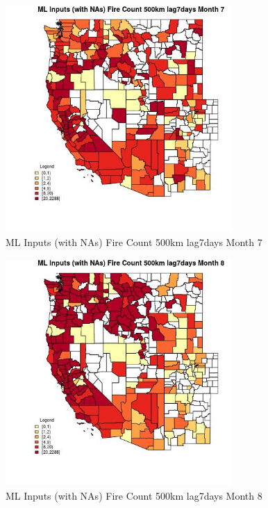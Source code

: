 \begin{figure} 
\centering  
\includegraphics[width=0.77\textwidth]{Code_Outputs/Report_ML_input_PM25_Step4_part_e_de_duplicated_aves_compiled_2019-05-20wNAs_CountyFire_Count_500km_lag7daysmedianMonth7.jpg} 
\caption{\label{fig:Report_ML_input_PM25_Step4_part_e_de_duplicated_aves_compiled_2019-05-20wNAsCountyFire_Count_500km_lag7daysmedianMonth7}ML Inputs (with NAs) Fire Count 500km lag7days Month 7} 
\end{figure} 
 

\begin{figure} 
\centering  
\includegraphics[width=0.77\textwidth]{Code_Outputs/Report_ML_input_PM25_Step4_part_e_de_duplicated_aves_compiled_2019-05-20wNAs_CountyFire_Count_500km_lag7daysmedianMonth8.jpg} 
\caption{\label{fig:Report_ML_input_PM25_Step4_part_e_de_duplicated_aves_compiled_2019-05-20wNAsCountyFire_Count_500km_lag7daysmedianMonth8}ML Inputs (with NAs) Fire Count 500km lag7days Month 8} 
\end{figure} 
 

